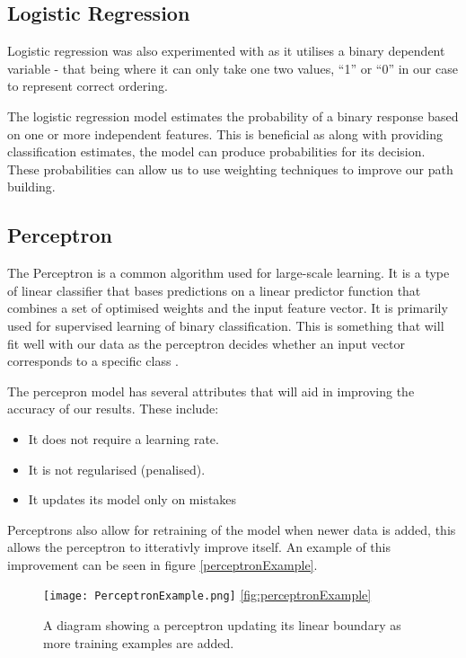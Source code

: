 \documentclass[bsc,frontabs,twoside,singlespacing,parskip,deptreport]{infthesis}     %
\begin{document}
\subsection{Logistic Regression}
Logistic regression was also experimented with as it utilises a binary dependent variable - that being where it
can only take one two values, ``1'' or ``0'' in our case to represent correct ordering.


The logistic regression model estimates the probability of a binary response based on one or more independent features.
This is beneficial as along with providing classification estimates, the model can produce probabilities for its
decision. These probabilities can allow us to use weighting techniques to improve our path building.

\subsection{Perceptron}
The Perceptron is a common algorithm used for large-scale learning.
It is a type of linear classifier that bases predictions on a linear predictor function that combines a set of optimised weights
and the input feature vector.
It is primarily used for supervised learning of binary classification.
This is something that will fit well with our data as the perceptron decides whether an input vector
corresponds to a specific class \cite{freund1999large}.

The percepron model has several attributes that will aid in improving the accuracy of our results.
These include:
\begin{itemize}
\item It does not require a learning rate.
\item It is not regularised (penalised).
\item It updates its model only on mistakes
\end{itemize}

Perceptrons also allow for retraining of the model when newer data is added, this allows the perceptron to
itterativly improve itself. An example of this improvement can be seen in figure \ref{perceptronExample}.
\begin{figure}[ht]
  \centering
  \texttt{[image: PerceptronExample.png]}
  \ref{fig:perceptronExample}
  \caption{A diagram showing a perceptron updating its linear boundary as more training examples are added. }
\end{figure}
\end{document}

